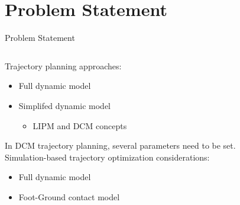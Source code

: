 \documentclass[aspectratio=169,t,xcolor=table]{beamer}
\begin{document}
\section{Problem Statement}
\begin{frame}{Problem Statement}
    \begin{columns}
        \begin{column}{0.5\textwidth}
            Trajectory planning approaches:
            \begin{itemize}
                \item Full dynamic model
                \item Simplifed dynamic model\\
                {\begin{itemize}
                \item LIPM and DCM concepts
                \end{itemize}}
            \end{itemize}
            \vspace{3mm}
            In DCM trajectory planning, several parameters need to be set.\\
            \vspace{3mm}
            Simulation-based trajectory optimization considerations:
            \begin{itemize}
                \item Full dynamic model
                \item Foot-Ground contact model
            \end{itemize}


\end{column}
\end{columns}
\end{frame}
\end{document}
